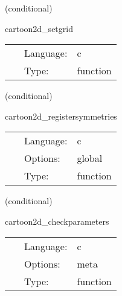 \documentclass{article}
\begin{document}
\vspace{5mm}

   (conditional) 

\hspace{5mm} cartoon2d\_setgrid 

\hspace{5mm}{\it adjust grid sizes } 


\hspace{5mm}

 \begin{tabular*}{160mm}{cll} 
~ & Language:  & c \\ 
~ & Type:  & function \\ 
\end{tabular*} 


\vspace{5mm}

   (conditional) 

\hspace{5mm} cartoon2d\_registersymmetries 

\hspace{5mm}{\it register symmetry boundaries } 


\hspace{5mm}

 \begin{tabular*}{160mm}{cll} 
~ & Language:  & c \\ 
~ & Options:  & global \\ 
~ & Type:  & function \\ 
\end{tabular*} 


\vspace{5mm}

   (conditional) 

\hspace{5mm} cartoon2d\_checkparameters 

\hspace{5mm}{\it check cartoon2d parameters } 


\hspace{5mm}

 \begin{tabular*}{160mm}{cll} 
~ & Language:  & c \\ 
~ & Options:  & meta \\ 
~ & Type:  & function \\ 
\end{tabular*} 
\end{document}
